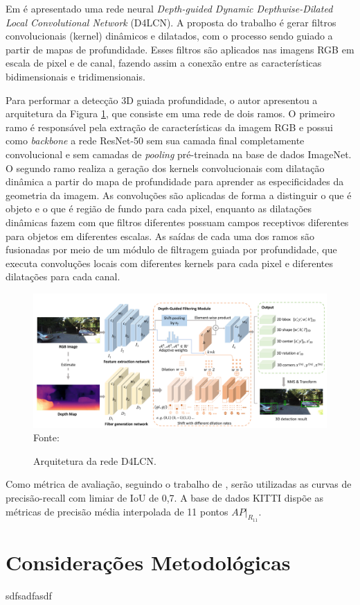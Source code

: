 Em  é apresentado uma rede neural \textit{Depth-guided Dynamic Depthwise-Dilated Local Convolutional Network} (D4LCN). A proposta do trabalho é gerar filtros convolucionais (kernel) dinâmicos e dilatados, com o processo sendo guiado a partir de mapas de profundidade. Esses filtros são aplicados nas imagens RGB em escala de pixel e de canal, fazendo assim a conexão entre as características bidimensionais e tridimensionais.


Para performar a detecção 3D guiada profundidade, o autor apresentou a arquitetura da Figura \ref{fig:d4lcn}, que consiste em uma rede de dois ramos. O primeiro ramo é responsável pela extração de características da imagem RGB e possui como \textit{backbone} a rede ResNet-50 sem sua camada final completamente convolucional e sem camadas de \textit{pooling} pré-treinada na base de dados ImageNet. O segundo ramo realiza a geração dos kernels convolucionais com dilatação dinâmica a partir do mapa de profundidade para aprender as especificidades da geometria da imagem. As convoluções são aplicadas de forma a distinguir o que é objeto e o que é região de fundo para cada pixel, enquanto as dilatações dinâmicas fazem com que filtros diferentes possuam campos receptivos diferentes para objetos em diferentes escalas. As saídas de cada uma dos ramos são fusionadas por meio de um módulo de filtragem guiada por profundidade, que executa convoluções locais com diferentes kernels para cada pixel e diferentes dilatações para cada canal. 




\begin{figure}[H]
    \centering
    \caption{Arquitetura da rede D4LCN. }
    \includegraphics[width=\textwidth]{fig/d4lcn.png}
    \footnotesize{Fonte: }
    \label{fig:d4lcn}
\end{figure}

Como métrica de avaliação, seguindo o trabalho de , serão utilizadas as curvas de precisão-recall com limiar de IoU de 0,7. A base de dados KITTI dispõe as métricas de precisão média interpolada de 11 pontos $AP|_{R_{11}}$.

\section{Considerações Metodológicas}

sdfsadfasdf